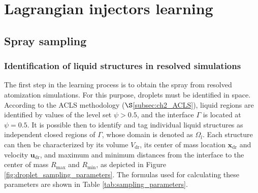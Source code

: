 




\section{Lagrangian injectors learning}
	\label{sec:ch4_SLI_learning}


\subsection{Spray sampling}
\label{subsec:SLI_spray_sampling}

\subsubsection*{Identification of liquid structures in resolved simulations}

The first step in the learning process is to obtain the spray from resolved atomization simulations. For this purpose, droplets must be identified in space. According to the ACLS methodology ($\S$\ref{subsec:ch2_ACLS}), liquid regions are identified by values of the level set $\psi > 0.5$, and the interface $\Gamma$ is located at $\psi = 0.5$. It is possible then to identify and tag individual liquid structures as independent closed regions of $\Gamma$, whose domain is denoted as $\Omega_l$. Each structure can then be characterized by its volume $V_\mathrm{dr}$, its center of mass location $\textbf{x}_\mathrm{dr}$ and velocity $\textbf{u}_\mathrm{dr}$, and maximum and minimum distances from the interface to the center of mass $R_\mathrm{max}$ and $R_\mathrm{min}$, as depicted in Figure \ref{fig:droplet_sampling_parameters}. The formulas used for calculating these parameters are shown in Table \ref{tab:sampling_parameters}. 


